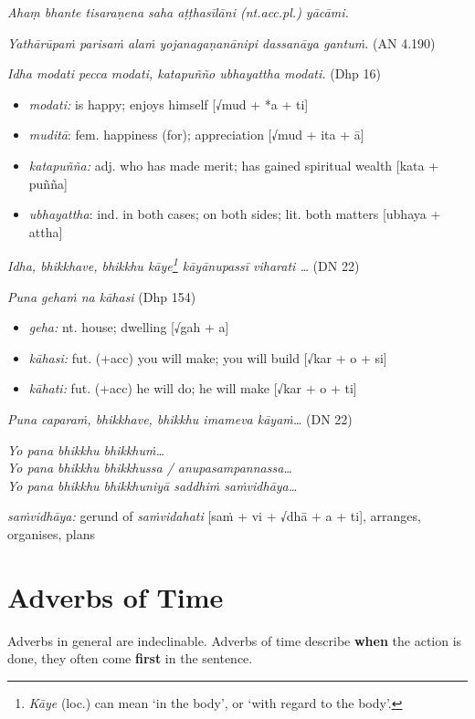 \documentclass[11pt,oneside]{memoir}
\begin{document}
\emph{Ahaṃ bhante tisaraṇena saha aṭṭhasīlāni (nt.acc.pl.) yācāmi.}

\emph{Yathārūpaṁ parisaṁ alaṁ yojanagaṇanānipi dassanāya gantuṁ.} (AN 4.190)

\emph{Idha modati pecca modati, katapuñño ubhayattha modati.} (Dhp 16)

\begin{itemize}
\item \emph{modati:} is happy; enjoys himself [√mud + *a + ti]
\item \emph{muditā}: fem. happiness (for); appreciation [√mud + ita + ā]
\item \emph{katapuñña:} adj. who has made merit; has gained spiritual wealth [kata + puñña]
\item \emph{ubhayattha}: ind. in both cases; on both sides; lit. both matters [ubhaya + attha]
\end{itemize}

\emph{Idha, bhikkhave, bhikkhu kāye\footnote{\emph{Kāye} (loc.) can mean `in the body', or `with regard to the body'.} kāyānupassī viharati \ldots{}} (DN 22)

\emph{Puna gehaṁ na kāhasi} (Dhp 154)

\begin{itemize}
\item \emph{geha:} nt. house; dwelling [√gah + a]
\item \emph{kāhasi:} fut. (+acc) you will make; you will build [√kar + o + si]
\item \emph{kāhati:} fut. (+acc) he will do; he will make [√kar + o + ti]
\end{itemize}

\emph{Puna caparaṁ, bhikkhave, bhikkhu imameva kāyaṁ\ldots{}} (DN 22)

\emph{Yo pana bhikkhu bhikkhuṁ\ldots{}} \\[0pt]
\emph{Yo pana bhikkhu bhikkhussa / anupasampannassa\ldots{}} \\[0pt]
\emph{Yo pana bhikkhu bhikkhuniyā saddhiṁ saṁvidhāya\ldots{}}

\emph{saṁvidhāya:} gerund of \emph{saṁvidahati} [saṁ + vi + √dhā + a + ti], arranges, organises, plans

\clearpage

\section{Adverbs of Time}
\label{sec:orgbac4189}

Adverbs in general are indeclinable. Adverbs of time describe \textbf{when} the action
is done, they often come \textbf{first} in the sentence.
\end{document}
